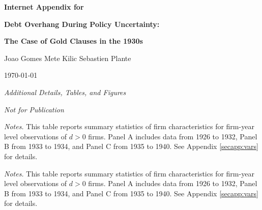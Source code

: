 \clearpage
 
\centerline{\large{\bf  {Internet Appendix for}}} 
\centerline{\large{\bf  {Debt Overhang During Policy Uncertainty:}}}
\centerline{\large{\bf  {The Case of Gold Clauses in the 1930s}}} 
\vspace{1cm}

\centerline{\large  Joao Gomes \hspace{1cm} Mete Kilic \hspace{1cm} Sebastien Plante}

\vspace*{3cm}

\begin{center}
\large \today
\end{center}


\vspace*{3cm}
\centerline{\large{\it  {Additional Details, Tables, and Figures} }}

\centerline{\large{\it  {Not for Publication} }}

\setcounter{table}{0}
\setcounter{figure}{0}
\setcounter{section}{0}
\renewcommand{\thetable}{IA.\arabic{table}}
\renewcommand{\thefigure}{IA.\arabic{figure}}
\pagestyle{fancy}
\fancyhf{}
\renewcommand{\headrulewidth}{0pt}
 \setcounter{page}{1}
\renewcommand{\thesection}{IA.\arabic{section}}

\vspace{2cm}

\clearpage 

\begin{table}[p]\centering
\caption{\\ Summary statistics for $d > 0$ firms}\scriptsize
\label{tabapp:sumd1}
  


\vspace*{3mm} \justifying \noindent
\scriptsize{\textit{Notes.} This table reports summary statistics of firm characteristics for firm-year level observations of $d > 0$ firms. Panel A includes data from 1926 to 1932, Panel B from 1933 to 1934, and Panel C from 1935 to 1940. See Appendix \ref{secapp:vars} for details.}
\end{table}

\begin{table}[p]\centering
\caption{\\ NEW: Summary statistics for $d > 0$ firms}\scriptsize
\label{tabapp:sumd1}
  


\vspace*{3mm} \justifying \noindent
\scriptsize{\textit{Notes.} This table reports summary statistics of firm characteristics for firm-year level observations of $d > 0$ firms. Panel A includes data from 1926 to 1932, Panel B from 1933 to 1934, and Panel C from 1935 to 1940. See Appendix \ref{secapp:vars} for details.}
\end{table}

